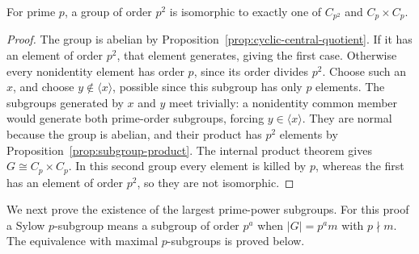 \begin{theorem}\label{thm:prime-square-groups}
For prime $p$, a group of order $p^2$ is isomorphic to exactly one of $C_{p^2}$ and $C_p\times C_p$.
\end{theorem}
\begin{proof}
The group is abelian by Proposition~\ref{prop:cyclic-central-quotient}. If it has an element of order $p^2$, that element generates, giving the first case. Otherwise every nonidentity element has order $p$, since its order divides $p^2$. Choose such an $x$, and choose $y\notin\langle x\rangle$, possible since this subgroup has only $p$ elements. The subgroups generated by $x$ and $y$ meet trivially: a nonidentity common member would generate both prime-order subgroups, forcing $y\in\langle x\rangle$. They are normal because the group is abelian, and their product has $p^2$ elements by Proposition~\ref{prop:subgroup-product}. The internal product theorem gives $G\cong C_p\times C_p$. In this second group every element is killed by $p$, whereas the first has an element of order $p^2$, so they are not isomorphic.
\end{proof}

We next prove the existence of the largest prime-power subgroups. For this proof a Sylow $p$-subgroup means a subgroup of order $p^a$ when $|G|=p^am$ with $p\nmid m$. The equivalence with maximal $p$-subgroups is proved below.

